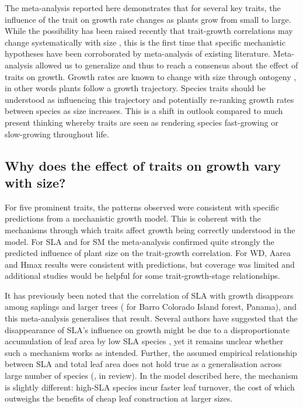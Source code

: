 \documentclass[a4paper,11pt]{article}
\begin{document}
The meta-analysis reported here demonstrates that for several key traits, the influence of the trait on growth rate changes as plants grow from small to large. While the possibility has been raised recently that trait-growth correlations may change systematically with size \citep{Falster:2011ii, Ruger:2012jv, Iida:2014ep, Iida:2014hq}, this is the first time that specific mechanistic hypotheses have been corroborated by meta-analysis of existing literature. Meta-analysis allowed us to generalize and thus to reach a consensus about the effect of traits on growth. Growth rates are known to change with size through ontogeny \citep{Condit:1993hd, Clark:1999ed, Herault:2011dd}, in other words plants follow a growth trajectory. Species traits should be understood as influencing this trajectory and potentially re-ranking growth rates between species as size increases. This is a shift in outlook compared to much present thinking whereby traits are seen as rendering species fast-growing or slow-growing throughout life.

\subsection*{Why does the effect of traits on growth vary with size?}

For five prominent traits, the patterns observed were consistent with specific predictions from a mechanistic growth model. This is coherent with the mechanisms through which traits affect growth being correctly understood in the model. For SLA and for SM the meta-analysis confirmed quite strongly the predicted influence of plant size on the trait-growth correlation. For WD, Aarea and Hmax results were consistent with predictions, but coverage was limited and additional studies would be helpful for some trait-growth-stage relationships.

It has previously been noted that the correlation of SLA with growth disappears among saplings and larger trees (\citealt{Wright:2010tp} for Barro Colorado Island forest, Panama), and this meta-analysis generalises that result. Several authors have suggested that the disappearance of SLA's influence on growth might be due to a disproportionate accumulation of leaf area by low SLA species \citep{Reich:1992wm,Poorter:2008iu,Wright:2010tp}, yet it remains unclear whether such a mechanism works as intended. Further, the assumed empirical relationship between SLA and total leaf area does not hold true as a generalisation across large number of species (\citeauthor{Duursma-2015}, in review). In the model described here, the mechanism is slightly different: high-SLA species incur faster leaf turnover, the cost of which outweighs the benefits of cheap leaf construction at larger sizes.
\end{document}
